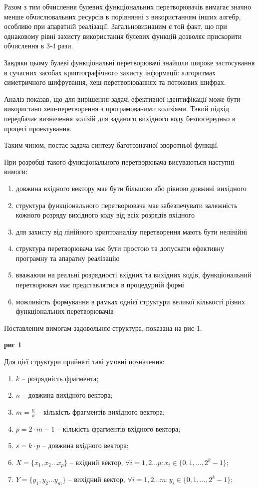 \documentclass[12pt]{article}
\begin{document}
Разом з тим обчислення булевих функціональних перетворювачів вимагає значно менше обчислювальних ресурсів в порівнянні з використанням інших алгебр, особливо при апаратній реалізації.
Загальновизнаним є той факт, що при однаковому рівні захисту використання булевих функцій дозволяє прискорити обчислення в 3-4 рази.

Завдяки цьому булеві функціональні перетворювачі знайшли широке застосування в сучасних засобах криптографічного захисту інформації: алгоритмах симетричного шифрування, хеш-перетворюваннях та потокових шифрах.

Аналіз показав, що для вирішення задачі ефективної ідентифікації може бути використано хеш-перетворення з програмованими колізіями. Такий підхід передбачає визначення колізій для заданого вихідного коду безпосередньо в процесі проектування.

Таким чином, постає задача синтезу баготозначної зворотньої функції.

При розробці такого функціонального перетворювача висуваються наступні вимоги:
\begin{enumerate}
\itemsep=0em
\item довжина вхідного вектору має бути більшою або рівною довжині вихідного
\item структура функціонального перетворювача має забезпечувати залежність кожного розряду вихідного коду від всіх розрядів вхідного
\item для захисту від лінійного криптоаналізу перетворення мають бути нелінійні
\item структура перетворювача має бути простою та допускати ефективну програмну та апаратну реалізацію
\item вважаючи на реальні розрядності вхідних та вихідних кодів, функціональний перетворювач має представлятися в процедурній формі
\item можливість формування в рамках однієї структури великої кількості різних функціональних перетворювачів
\end{enumerate}

Поставленим вимогам задовольняє структура, показана на рис 1.

\begin{center}
\textbf{рис 1}
\end{center}

Для цієї структури прийняті такі умовні позначення:
\begin{enumerate}
\itemsep=0em
\item $k$ -- розрядність фрагмента;
\item $n$ -- довжина вихідного вектора;
\item $m = \frac{n}{k}$ -- кількість фрагментів вихідного вектора;
\item $p = 2 \cdot m - 1$ -- кількість фрагментів вхідного вектора;
\item $s = k \cdot p$ -- довжина вхідного вектора;
\item $X = \{x_1, x_2 \ldots x_p\}$ -- вхідний вектор, $\forall i=1,2 \ldots p : x_i \in \{0,1, \ldots ,2^k-1\}$;
\item $Y = \{y_1, y_2 \ldots y_m\}$ -- вихідний вектор, $\forall i=1,2 \ldots m : y_i \in \{0,1, \ldots ,2^k-1\}$;
\end{enumerate}
\end{document}
